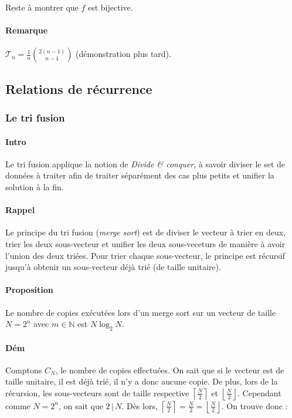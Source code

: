 \documentclass{article}
\begin{document}
			Reste à montrer que $f$ est bijective.  %

			\paragraph{Remarque} $\mathcal T_n = \frac 1n\binom {2(n-1)}{n-1}$ (démonstration plus tard).

		\subsection{Relations de récurrence}

			\subsubsection{Le tri fusion}
			
			\paragraph{Intro} Le tri fusion applique la notion de \textit{Divide \& conquer}, à savoir diviser le set de données à traiter afin de traiter
			séparément des cas plus petits et unifier la solution à la fin.

			\paragraph{Rappel} Le principe du tri fusion (\textit{merge sort}) est de diviser le vecteur à trier en deux, trier les deux sous-vecteur et
			unifier les deux sous-veceturs de manière à avoir l'union des deux triées. Pour trier chaque sous-vecteur, le principe est récursif jusqu'à obtenir
			un sous-vecteur déjà trié (de taille unitaire).

			\paragraph{Proposition} Le nombre de copies exécutées lors d'un merge sort sur un vecteur de taille $N = 2^n$ avec $m \in \mathbb N$ est $N\log_2N$.

			\paragraph{Dém} Comptons $C_N$, le nombre de copies effectuées. On sait que si le vecteur est de taille unitaire, il est déjà trié, il n'y a donc aucune copie.
			De plus, lors de la récursion, les sous-vecteurs sont de taille respective $\left \lceil \frac N2 \right \rceil$ et $\left \lfloor \frac N2 \right \rfloor$.
			Cependant comme $N = 2^n$, on sait que $2 \, | \, N$. Dès lors, $\left \lceil \frac N2 \right \rceil = \frac N2 = \left \lfloor \frac N2 \right \rfloor$.
			On trouve donc :
\end{document}
